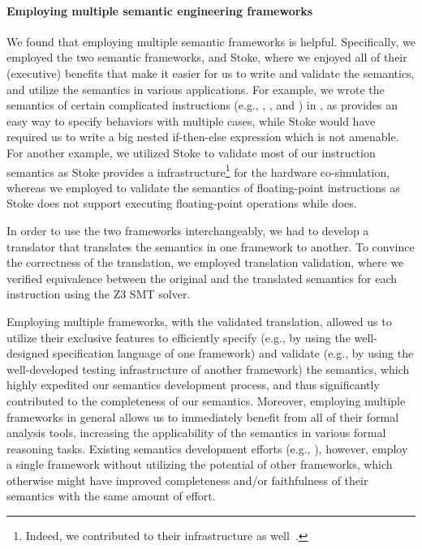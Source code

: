 \paragraph{Employing multiple semantic engineering frameworks}

We found that employing multiple semantic frameworks is helpful. Specifically, we employed the two semantic frameworks, \K and Stoke, where we enjoyed all of their (executive) benefits that make it easier for us to write and validate the semantics, and utilize the semantics in various applications. For example, we wrote the semantics of certain complicated instructions (e.g., , , and ) in \K, as \K provides an easy way to specify behaviors with multiple cases, while Stoke would have required us to write a big nested if-then-else expression which is not amenable. For another example, we utilized Stoke to validate most of our instruction semantics as Stoke provides a infrastructure\footnote{Indeed, we contributed to their infrastructure as well~\cite{completing-stock,improving-stoke}.} for the hardware co-simulation, whereas we employed \K to validate the semantics of floating-point instructions as Stoke does not support executing floating-point operations while \K does.

In order to use the two frameworks interchangeably, we had to develop a translator that translates the semantics in one framework to another. To convince the correctness of the translation, we employed translation validation, where we verified equivalence between the original and the translated semantics for each instruction using the Z3 SMT solver. 

Employing multiple frameworks, with the validated translation, allowed us to utilize their exclusive features to efficiently specify (e.g., by using the well-designed specification language of one framework) and validate (e.g., by using the well-developed testing infrastructure of another framework) the semantics, which highly expedited our semantics development process, and thus significantly contributed to the completeness of our semantics.
Moreover, employing multiple frameworks in general allows us to immediately benefit from all of their formal analysis tools, increasing the applicability of the semantics in various formal reasoning tasks.
Existing semantics development efforts (e.g., \cite{Goel:FMCAD14,Heule2016a}), however, %
employ a single framework without utilizing the potential of other frameworks, which otherwise might have improved completeness and/or faithfulness of their semantics with the same amount of effort.

